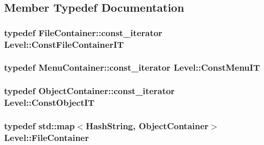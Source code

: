 \subsection{Member Typedef Documentation}
\subsubsection[{\texorpdfstring{Const\+File\+Container\+IT}{ConstFileContainerIT}}]{\setlength{\rightskip}{0pt plus 5cm}typedef File\+Container\+::const\+\_\+iterator {\bf Level\+::\+Const\+File\+Container\+IT}}\hypertarget{classLevel_a4159ff1339674f9e5b849654f0f8eff5}{}\label{classLevel_a4159ff1339674f9e5b849654f0f8eff5}
\subsubsection[{\texorpdfstring{Const\+Menu\+IT}{ConstMenuIT}}]{\setlength{\rightskip}{0pt plus 5cm}typedef Menu\+Container\+::const\+\_\+iterator {\bf Level\+::\+Const\+Menu\+IT}}\hypertarget{classLevel_a9a6ea1b9ae75b0a1ccaa086d6409a68d}{}\label{classLevel_a9a6ea1b9ae75b0a1ccaa086d6409a68d}
\subsubsection[{\texorpdfstring{Const\+Object\+IT}{ConstObjectIT}}]{\setlength{\rightskip}{0pt plus 5cm}typedef Object\+Container\+::const\+\_\+iterator {\bf Level\+::\+Const\+Object\+IT}}\hypertarget{classLevel_ae641436b16729449987f49a008240df2}{}\label{classLevel_ae641436b16729449987f49a008240df2}
\subsubsection[{\texorpdfstring{File\+Container}{FileContainer}}]{\setlength{\rightskip}{0pt plus 5cm}typedef std\+::map$<${\bf Hash\+String}, {\bf Object\+Container}$>$ {\bf Level\+::\+File\+Container}}\hypertarget{classLevel_ace1da2e0393bc7528301ad2220c7f136}{}\label{classLevel_ace1da2e0393bc7528301ad2220c7f136}
